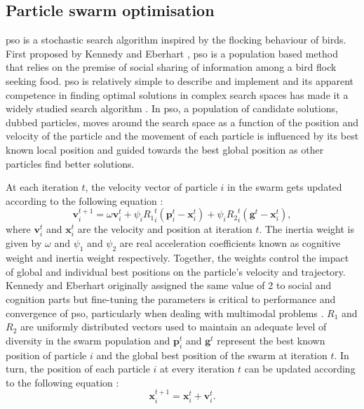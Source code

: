 	
	\subsection{Particle swarm optimisation}
	
	\gls{pso} is a stochastic search algorithm inspired by the flocking behaviour of birds. First proposed by Kennedy and Eberhart \cite{Eberhart:1995aa,Kennedy95}, \gls{pso} is a population based method that relies on the premise of social sharing of information among a bird flock seeking food. \gls{pso} is relatively simple to describe and implement and its apparent competence in finding optimal solutions in complex search spaces has made it a widely studied search algorithm \cite{Freitas:2020aa}. In \gls{pso}, a population of candidate solutions, dubbed particles, moves around the search space as a function of the position and velocity of the particle and the movement of each particle is influenced by its best known local position and guided towards the best global position as other particles find better solutions. 

	At each iteration $t$, the velocity vector of particle $i$ in the swarm gets updated according to the following equation \cite{Bonyadi:2017aa}:
	\begin{equation} \label{eq:PSO_vel}
		\mathbf{v}_i^{t+1} = \omega \mathbf{v}_i^{t} + \psi_i {R_1}_i^t \left( \mathbf{p}_i^{t} - \mathbf{x}_i^{t} \right) +\psi_i {R_2}_i^t \left( \mathbf{g}^{t} - \mathbf{x}_i^{t} \right),
	\end{equation}
	where $\mathbf{v}_i^t$ and $\mathbf{x}_i^t$ are the velocity and position at iteration $t$. The inertia weight is given by $\omega$ and $\psi_1$ and $\psi_2$ are real acceleration coefficients known as cognitive weight and inertia weight respectively. Together, the weights control the impact of global and individual best positions on the particle's velocity and trajectory. Kennedy and Eberhart \cite{Kennedy95} originally assigned the same value of \num{2} to social and cognition parts but fine-tuning the parameters is critical to performance and convergence of \gls{pso}, particularly when dealing with multimodal problems \cite{Carlisle:2001aa,Trelea:2003aa,van-den-Bergh:2006aa}. $R_1$ and $R_2$ are uniformly distributed vectors used to maintain an adequate level of diversity in the swarm population and $\mathbf{p}_i^{t}$ and $\mathbf{g}^{t}$ represent the best known position of particle $i$ and the global best position of the swarm at iteration $t$. In turn, the position of each particle $i$ at every iteration $t$ can be updated according to the following equation \cite{Bonyadi:2017aa}:
	\begin{equation}  \label{eq:PSO_pos}
		\mathbf{x}_i^{t+1} = \mathbf{x}_i^{t} + \mathbf{v}_i^{t}.
	\end{equation}
	
